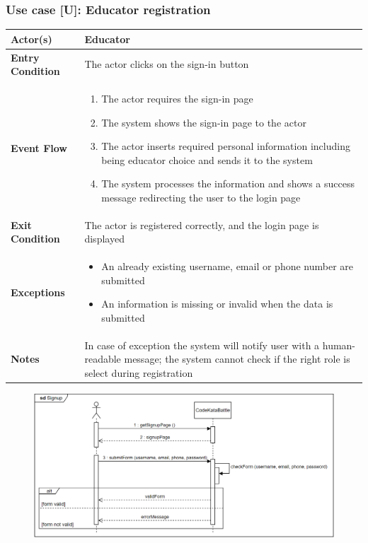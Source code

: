 \documentclass[12pt, a4paper]{report}
\newcounter{useCase}
\newcommand{\usecase}[9]{
    \def\arraystretch{1.5} 
    \subsubsection*{Use case [U#2]: #3}
    \vspace*{0.2cm}
    \begin{center}
        \begin{tabular}{|l|p{12cm}|}
            \hline
            \textbf{Actor(s)} & #4 \\
            \hline
            \textbf{Entry Condition} & #5 \\
            \hline
            \textbf{Event Flow} & #6 \\
            \hline
            \textbf{Exit Condition} & #7 \\
            \hline
            \textbf{Exceptions} & #8 \\
            \hline
            \textbf{Notes} & #9 \\
            \hline
        \end{tabular}
    \end{center}
    #1
}
\begin{document}
        \usecase 
        {\begin{figure}[H]\centering\includegraphics[width=0.9\linewidth]{images/signup.png}\end{figure}}        
        {\arabic{useCase}\stepcounter{useCase}}
        {Educator registration}
        {Educator}
        {The actor clicks on the sign-in button}
        {
        \begin{enumerate}
            \item The actor requires the sign-in page
            \item The system shows the sign-in page to the actor
            \item The actor inserts required personal information including being educator choice and sends it to the system
            \item The system processes the information and shows a success message redirecting the user to the login page
        \end{enumerate}
        }
        {The actor is registered correctly, and the login page is displayed}
        {
        \begin{itemize}
            \item An already existing username, email or phone number are submitted
            \item An information is missing or invalid when the data is submitted
        \end{itemize}
        }
        {In case of exception the system will notify user with a human-readable message; the system cannot check if the right role is select during registration}
\end{document}
